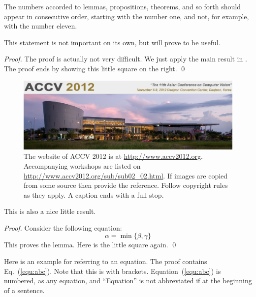 \documentclass[runningheads]{llncs}
\begin{document}
The numbers accorded to lemmas, propositions, theorems, and so forth should
appear in consecutive order, starting with the number one, and not, for
example, with the number eleven.

\begin{lemma}
This statement is not important on its own, but will prove to be useful.
\label{lem:whatever}
\end{lemma}

\begin{proof}
The proof is actually not very difficult. We just apply the main result in \cite{Alpher03}.
The proof ends by showing this little square on the right.
\qed
\end{proof}

\begin{figure}[b]
\centering
\includegraphics[width=120mm]{accv2012logo.png}
\caption{
The website of ACCV 2012 is at \url{http://www.accv2012.org}. Accompanying
workshops are listed on \url{http://www.accv2012.org/sub/sub02\_02.html}.
If images are copied from some source then provide the reference.
Follow copyright rules as they apply. A caption ends with a full stop.
}
\label{fig:accv10}
\end{figure}

\begin{lemma}
This is also a nice little result.
\label{lem:xyz}
\end{lemma}

\begin{proof}
Consider the following equation:
%
\begin{equation}
\alpha = \min \{\beta, \gamma \}
\label{equ:abc}
\end{equation}
%
This proves the lemma. Here is the little square again.
\qed
\end{proof}

Here is an example for referring to an equation. The proof contains Eq.~(\ref{equ:abc}).
Note that this is with brackets. Equation~(\ref{equ:abc}) is numbered, as any equation, and
``Equation'' is not abbreviated if at the beginning of a sentence.
\end{document}
